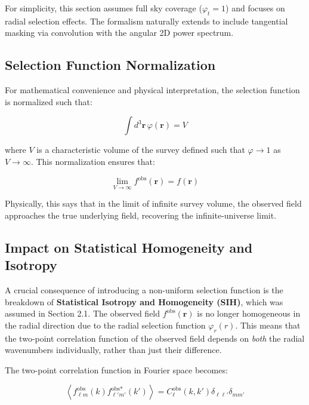 For simplicity, this section assumes full sky coverage ($\varphi_t = 1$) and focuses on radial selection effects. The formalism naturally extends to include tangential masking via convolution with the angular 2D power spectrum.

\subsection{Selection Function Normalization}

For mathematical convenience and physical interpretation, the selection function is normalized such that:

\begin{equation}
\int d^3\mathbf{r} \, \varphi(\mathbf{r}) = V
\label{eq:selection_normalization}
\end{equation}

where $V$ is a characteristic volume of the survey defined such that $\varphi \to 1$ as $V \to \infty$. This normalization ensures that:

\begin{equation}
\lim_{V \to \infty} f^{\text{obs}}(\mathbf{r}) = f(\mathbf{r})
\label{eq:limiting_case}
\end{equation}

Physically, this says that in the limit of infinite survey volume, the observed field approaches the true underlying field, recovering the infinite-universe limit.

\subsection{Impact on Statistical Homogeneity and Isotropy}

A crucial consequence of introducing a non-uniform selection function is the breakdown of \textbf{Statistical Isotropy and Homogeneity (SIH)}, which was assumed in Section 2.1. The observed field $f^{\text{obs}}(\mathbf{r})$ is no longer homogeneous in the radial direction due to the radial selection function $\varphi_r(r)$. This means that the two-point correlation function of the observed field depends on \emph{both} the radial wavenumbers individually, rather than just their difference.

The two-point correlation function in Fourier space becomes:

\begin{equation}
\left\langle f_{\ell m}^{\text{obs}}(k) f_{\ell' m'}^{\text{obs}*}(k') \right\rangle = C_\ell^{\text{obs}}(k, k') \delta_{\ell \ell'} \delta_{m m'}
\label{eq:observed_corr_func}
\end{equation}

